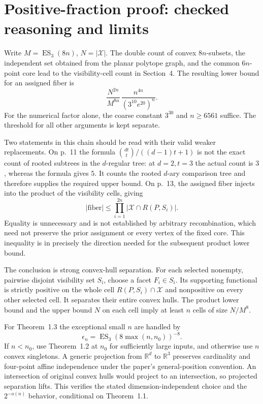 \documentclass[10pt]{article}
\begin{document}
\section*{Positive-fraction proof: checked reasoning and limits}
Write \(M=\operatorname{ES}_3(8n)\), \(N=|\mathcal X|\). The double count of convex \(8n\)-subsets, the independent set obtained from the planar polytope graph, and the common \(6n\)-point core lead to the visibility-cell count in Section 4. The resulting lower bound for an assigned fiber is \[\frac{N^{2n}}{M^{8n}}\,
 \frac{n^{4n}}{(3^{10}e^{20})^n}.\] For the numerical factor alone, the coarse constant \(3^{30}\) and \(n\ge6561\) suffice. The threshold for all other arguments is kept separate.\par
Two statements in this chain should be read with their valid weaker replacements. On p. 11 the formula \(\binom{dt}{t}/((d-1)t+1)\) is not the exact count of rooted subtrees in the \(d\)-regular tree: at \(d=2,t=3\) the actual count is \(3\), whereas the formula gives \(5\). It counts the rooted \(d\)-ary comparison tree and therefore supplies the required upper bound. On p. 13, the assigned fiber injects into the product of the visibility cells, giving \[|\text{fiber}|\le \prod_{i=1}^{2n}|\mathcal X\cap R(P,S_i)|.\] Equality is unnecessary and is not established by arbitrary recombination, which need not preserve the prior assignment or every vertex of the fixed core. This inequality is in precisely the direction needed for the subsequent product lower bound.\par
The conclusion is strong convex-hull separation. For each selected nonempty, pairwise disjoint visibility set \(S_i\), choose a facet \(F_i\in S_i\). Its supporting functional is strictly positive on the whole cell \(R(P,S_i)\cap\mathcal X\) and nonpositive on every other selected cell. It separates their entire convex hulls. The product lower bound and the upper bound \(N\) on each cell imply at least \(n\) cells of size \(N/M^8\).\par
For Theorem 1.3 the exceptional small \(n\) are handled by \[\epsilon_n=\operatorname{ES}_3\!\left(8\max(n,n_0)\right)^{-8}.\] If \(n<n_0\), use Theorem 1.2 at \(n_0\) for sufficiently large inputs, and otherwise use \(n\) convex singletons. A generic projection from \(\mathbb R^d\) to \(\mathbb R^3\) preserves cardinality and four-point affine independence under the paper’s general-position convention. An intersection of original convex hulls would project to an intersection, so projected separation lifts. This verifies the stated dimension-independent choice and the \(2^{-o(n)}\) behavior, conditional on Theorem 1.1.\par
\end{document}
